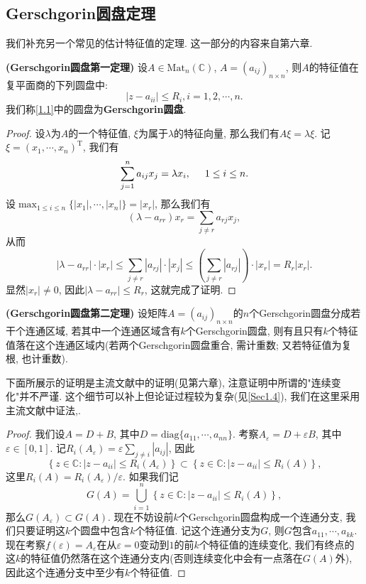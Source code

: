 \subsection{Gerschgorin圆盘定理}
我们补充另一个常见的估计特征值的定理. 这一部分的内容来自\cite{姚慕生2008高等代数学}第六章.
\begin{theorem}{\textbf{(Gerschgorin圆盘第一定理)}}
设$A\in\mathrm{Mat}_n(\mathbb{C})$, $A=(a_{ij})_{n\times n}$, 则$A$的特征值在复平面商的下列圆盘中: 
\begin{equation}\label{1.1}
|z-a_{ii}|\le R_i,i=1,2,\cdots,n.
\end{equation}
我们称\eqref{1.1}中的圆盘为\textbf{Gerschgorin圆盘}.
\end{theorem}
\begin{proof}
设$\lambda$为$A$的一个特征值, $\xi$为属于$\lambda$的特征向量, 那么我们有$A\xi=\lambda\xi$. 记$\xi=(x_1,\cdots,x_n)^\mathrm{T}$, 我们有
$$
\sum_{j=1}^n{a_{ij}x_j}=\lambda x_i,\hspace{0.5cm}1\le i\le n.
$$
设$\max_{1\le i\le n}\{|x_1|,\cdots,|x_n|\}=|x_r|$, 那么我们有
$$
\left( \lambda -a_{rr} \right) x_r=\sum_{j\ne r}{a_{rj}x_j},
$$
从而
$$
\left| \lambda -a_{rr} \right|\cdot \left| x_r \right|\le \sum_{j\ne r}{\left| a_{rj} \right|\cdot \left| x_j \right|}\le \left( \sum_{j\ne r}{\left| a_{rj} \right|} \right) \cdot \left| x_r \right|=R_r\left| x_r \right|.
$$
显然$|x_r|\ne 0$, 因此$|\lambda-a_{rr}|\le R_r$, 这就完成了证明.
\end{proof}
\begin{theorem}{\textbf{(Gerschgorin圆盘第二定理)}}
设矩阵$A=(a_{ij})_{n\times n}$的$n$个Gerschgorin圆盘分成若干个连通区域, 若其中一个连通区域含有$k$个Gerschgorin圆盘, 则有且只有$k$个特征值落在这个连通区域内(若两个Gerschgorin圆盘重合, 需计重数; 又若特征值为复根, 也计重数).
\end{theorem}
\begin{note}
下面所展示的证明是主流文献中的证明(见\cite{horn2012matrix}第六章), 注意证明中所谓的"连续变化"并不严谨. 这个细节可以补上但论证过程较为复杂(见\ref{Sec1.4}), 我们在这里采用主流文献中证法,.
\end{note}
\begin{proof}
我们设$A=D+B$, 其中$D=\mathrm{diag}\{a_{11},\cdots,a_{nn}\}$. 考察$A_\varepsilon=D+\varepsilon B$, 其中$\varepsilon\in[0,1]$. 记$R_i(A_\varepsilon)=\varepsilon\sum_{j\ne i}|a_{ij}|$, 因此
$$
\left\{ z\in \mathbb{C} :\left| z-a_{ii} \right|\le R_i\left( A_{\varepsilon} \right) \right\} \subset \left\{ z\in \mathbb{C} :\left| z-a_{ii} \right|\le R_i\left( A \right) \right\} ,
$$
这里$R_i(A)=R_i(A_\varepsilon)/\varepsilon$. 如果我们记
$$
G\left( A \right) =\bigcup_{i=1}^n{\left\{ z\in \mathbb{C} :\left| z-a_{ii} \right|\le R_i\left( A \right) \right\}},
$$
那么$G(A_\varepsilon)\subset G(A)$. 现在不妨设前$k$个Gerschgorin圆盘构成一个连通分支, 我们只要证明这$k$个圆盘中包含$k$个特征值. 记这个连通分支为$G$, 则$G$包含$a_{11},\cdots,a_{kk}$. 现在考察$f(\varepsilon)=A_\varepsilon$在从$\varepsilon=0$变动到$1$的前$k$个特征值的连续变化, 我们有终点的这$k$的特征值仍然落在这个连通分支内(否则连续变化中会有一点落在$G(A)$外), 因此这个连通分支中至少有$k$个特征值.
\end{proof}
